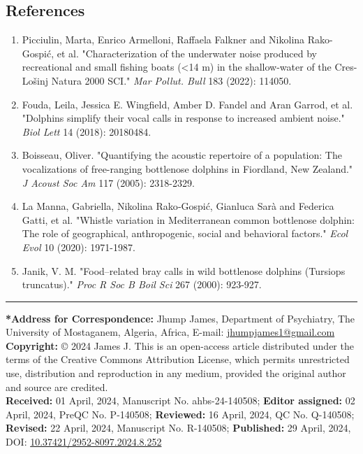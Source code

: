 \documentclass{article}
\begin{document}
\begin{multicols}{2}
\section*{References}
\fontsize{8}{9.6}\selectfont
\begin{enumerate}
    \item Picciulin, Marta, Enrico Armelloni, Raffaela Falkner and Nikolina Rako-Gospić, et al. "Characterization of the underwater noise produced by recreational and small fishing boats (<14 m) in the shallow-water of the Cres-Lošinj Natura 2000 SCI." \textit{Mar Pollut. Bull} 183 (2022): 114050.
    \item Fouda, Leila, Jessica E. Wingfield, Amber D. Fandel and Aran Garrod, et al. "Dolphins simplify their vocal calls in response to increased ambient noise." \textit{Biol Lett} 14 (2018): 20180484.
    \item Boisseau, Oliver. "Quantifying the acoustic repertoire of a population: The vocalizations of free-ranging bottlenose dolphins in Fiordland, New Zealand." \textit{J Acoust Soc Am} 117 (2005): 2318-2329.
    \item La Manna, Gabriella, Nikolina Rako‐Gospić, Gianluca Sarà and Federica Gatti, et al. "Whistle variation in Mediterranean common bottlenose dolphin: The role of geographical, anthropogenic, social and behavioral factors." \textit{Ecol Evol} 10 (2020): 1971-1987.
    \item Janik, V. M. "Food–related bray calls in wild bottlenose dolphins (Tursiops truncatus)." \textit{Proc R Soc B Boil Sci} 267 (2000): 923-927.
\end{enumerate}
\end{multicols}

\vfill
\noindent
\hspace*{0pt}\color{color_100238}\rule{\textwidth}{1pt}
\par\vspace{0.3cm} %

\fontsize{8.5}{10.2}\selectfont
\color{color_100238}\textbf{*Address for Correspondence:} 
\color{color_29791}Jhump James, Department of Psychiatry, The University of Mostaganem, Algeria, Africa, 
E-mail: \href{mailto:jhumpjames1@gmail.com}{jhumpjames1@gmail.com} \\

\color{color_100238}\textbf{Copyright:} 
\color{color_29791}© 2024 James J. This is an open-access article distributed under the terms of the Creative Commons Attribution License, which permits unrestricted use, distribution and reproduction in any medium, provided the original author and source are credited. \\

\vspace{0.1cm}
\color{color_29791}\textbf{Received:} 01 April, 2024, Manuscript No. ahbs-24-140508; 
\textbf{Editor assigned:} 02 April, 2024, PreQC No. P-140508; 
\textbf{Reviewed:} 16 April, 2024, QC No. Q-140508; 
\textbf{Revised:} 22 April, 2024, Manuscript No. R-140508; 
\textbf{Published:} 29 April, 2024, 
DOI: \href{https://doi.org/10.37421/2952-8097.2024.8.252}{10.37421/2952-8097.2024.8.252}

\label{TotPages}
\end{document}
